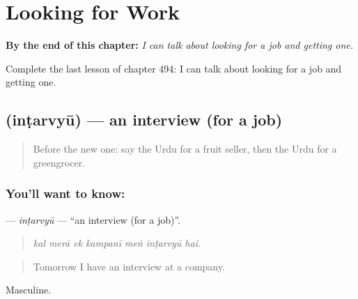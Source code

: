 
\chapter{Looking for Work}
\label{ch:ur-looking-for-work}

\begin{chapteropening}
\textbf{By the end of this chapter:} \emph{I can talk about looking for a job and getting one.}

Complete the last lesson of chapter 494: I can talk about looking for a job and getting one.
\end{chapteropening}

\section[\texorpdfstring{\ur{انٹرویو} (inṭarvyū)}{انٹرویو (inṭarvyū)}]{ (inṭarvyū) — an interview (for a job)}

\label{lesson:UR-C494-intarvyu}



\begin{quote}
Before the new one: say the Urdu for a fruit seller, then the Urdu for a greengrocer.
\end{quote}

\subsection*{You'll want to know: }
\textbf{} — \emph{inṭarvyū} — \textquotedblleft{}an interview (for a job)\textquotedblright{}.

\begin{quote}
      
\end{quote}

\begin{quote}
\emph{kal merā ek kampanī meṅ inṭarvyū hai.}
\end{quote}

\begin{quote}
Tomorrow I have an interview at a company.
\end{quote}

Masculine.

